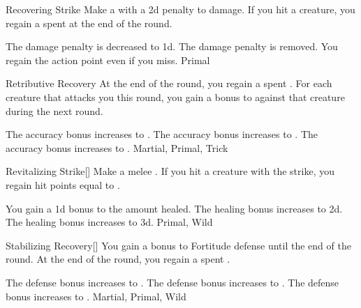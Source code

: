 \lowercase{\hypertarget{maneuver:Recovering Strike}{}}\label{maneuver:Recovering Strike}
\begin{freeability}{\hypertarget{maneuver:Recovering Strike}{Recovering Strike}}
Make a  with a \minus2d penalty to damage.
If you hit a creature, you regain a spent  at the end of the round.

\rankline
{} The damage penalty is decreased to \minus1d.
 The damage penalty is removed.
 You regain the action point even if you miss.
 Primal
\end{freeability}
\vspace{0.25em}



\lowercase{\hypertarget{maneuver:Retributive Recovery}{}}\label{maneuver:Retributive Recovery}
\begin{freeability}{\hypertarget{maneuver:Retributive Recovery}{Retributive Recovery}}
At the end of the round, you regain a spent .
For each creature that attacks you this round, you gain
a  bonus to  against that creature during the next round.

\rankline
{} The accuracy bonus increases to .
 The accuracy bonus increases to .
 The accuracy bonus increases to .
 Martial, Primal, Trick
\end{freeability}
\vspace{0.25em}



\lowercase{\hypertarget{maneuver:Revitalizing Strike}{}}\label{maneuver:Revitalizing Strike}
\begin{apability}{\hypertarget{maneuver:Revitalizing Strike}{Revitalizing Strike}}[]
Make a melee .
If you hit a creature with the strike, you regain hit points equal to .

\rankline
{} You gain a \plus1d bonus to the amount healed.
 The healing bonus increases to \plus2d.
 The healing bonus increases to \plus3d.
 Primal, Wild
\end{apability}
\vspace{0.25em}



\lowercase{\hypertarget{maneuver:Stabilizing Recovery}{}}\label{maneuver:Stabilizing Recovery}
\begin{freeability}{\hypertarget{maneuver:Stabilizing Recovery}{Stabilizing Recovery}}[]
You gain a  bonus to Fortitude defense until the end of the round.
At the end of the round, you regain a spent .

\rankline
{} The defense bonus increases to .
 The defense bonus increases to .
 The defense bonus increases to .
 Martial, Primal, Wild
\end{freeability}
\vspace{0.25em}



